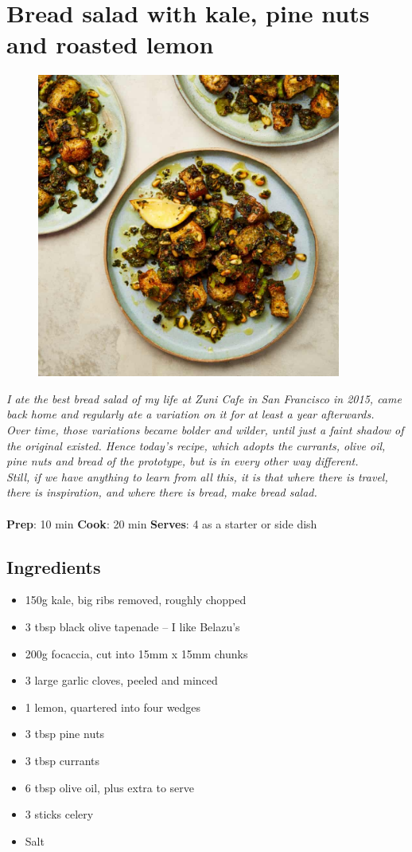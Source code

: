 \documentclass{book}
\begin{document}
\section{Bread salad with kale, pine nuts and roasted lemon}
\begin{figure}
\centering\includegraphics[width=10cm,height=10cm,keepaspectratio]{Recipe_Pictures/Bread_salad_with_kale,_pine_nuts_and_roasted_lemon.png}
\end{figure}
\emph{I ate the best bread salad of my life at Zuni Cafe in San Francisco in 2015, came back home and regularly ate a variation on it for at least a year afterwards. \\ 
Over time, those variations became bolder and wilder, until just a faint shadow of the original existed. Hence today’s recipe, which adopts the currants, olive oil, pine nuts and bread of the prototype, but is in every other way different. \\ 
Still, if we have anything to learn from all this, it is that where there is travel, there is inspiration, and where there is bread, make bread salad.}\\\\ 
\textbf{Prep}: 10 min
\textbf{Cook}: 20 min
\textbf{Serves}: 4 as a starter or side dish
\subsection*{Ingredients}
\begin{itemize}
\item 150g kale, big ribs removed, roughly chopped
\item 3 tbsp black olive tapenade – I like Belazu’s
\item 200g focaccia, cut into 15mm x 15mm chunks
\item 3 large garlic cloves, peeled and minced
\item 1 lemon, quartered into four wedges
\item 3 tbsp pine nuts
\item 3 tbsp currants
\item 6 tbsp olive oil, plus extra to serve
\item 3 sticks celery
\item Salt
\end{itemize}
\end{document}
